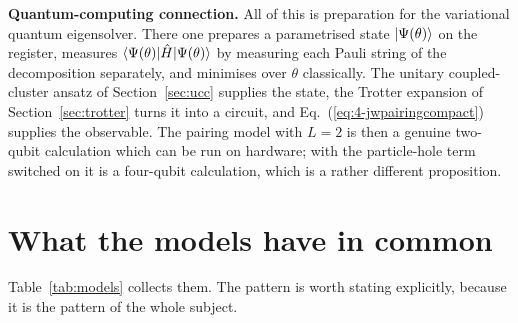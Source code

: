 \begin{notebox}
\textbf{Quantum-computing connection.} All of this is preparation for the
variational quantum eigensolver.  There one prepares a parametrised state
$\vert \Psi(\theta) \rangle$ on the register, measures
$\langle \Psi(\theta) | \hat{H} | \Psi(\theta) \rangle$ by measuring each Pauli string
of the decomposition separately, and minimises over $\theta$ classically.  The
unitary coupled-cluster ansatz of Section~\ref{sec:ucc} supplies the state,
the Trotter expansion of Section~\ref{sec:trotter} turns it into a circuit,
and Eq.~(\ref{eq:4-jwpairingcompact}) supplies the observable.  The pairing
model with $L=2$ is then a genuine two-qubit calculation which can be run on
hardware; with the particle-hole term switched on it is a four-qubit
calculation, which is a rather different proposition.
\end{notebox}

\section{What the models have in common}
\label{sec:modelssummary}

Table~\ref{tab:models} collects them.  The pattern is worth stating
explicitly, because it is the pattern of the whole subject.

